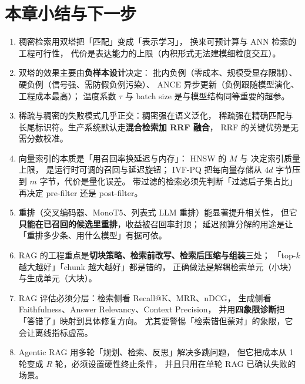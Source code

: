 \section{本章小结与下一步}

\begin{keypoint}[本章要点回顾]
\begin{enumerate}
  \item 稠密检索用双塔把「匹配」变成「表示学习」，
        换来可预计算与 ANN 检索的工程可行性，
        代价是表达能力的上限（内积形式无法建模细粒度交互）。
  \item 双塔的效果主要由\textbf{负样本设计}决定：
        批内负例（零成本、规模受显存限制）、硬负例（信号强、需防假负例污染）、
        ANCE 异步更新（负例跟随模型演化、工程成本最高）；
        温度系数 $\tau$ 与 batch size 是与模型结构同等重要的超参。
  \item 稀疏与稠密的失败模式几乎正交：稠密强在语义泛化，
        稀疏强在精确匹配与长尾标识符。生产系统默认走\textbf{混合检索加 RRF 融合}，
        RRF 的关键优势是无需分数校准。
  \item 向量索引的本质是「用召回率换延迟与内存」：
        HNSW 的 $M$ 与  决定索引质量上限，
         是运行时可调的召回与延迟旋钮；
        IVF-PQ 把每向量存储从 $4d$ 字节压到 $m$ 字节，代价是量化误差。
        带过滤的检索必须先判断「过滤后子集占比」再决定 pre-filter 还是 post-filter。
  \item 重排（交叉编码器、MonoT5、列表式 LLM 重排）能显著提升相关性，
        但它\textbf{只能在已召回的候选里重排}，收益被召回率封顶；
        延迟预算分解的用途是让「重排多少条、用什么模型」有据可依。
  \item RAG 的工程重点是\textbf{切块策略、检索前改写、检索后压缩与组装}三处；
        「top-$k$ 越大越好」「chunk 越大越好」都是错的，
        正确做法是解耦检索单元（小块）与生成单元（大块）。
  \item RAG 评估必须分层：检索侧看 Recall@K、MRR、nDCG，
        生成侧看 Faithfulness、Answer Relevancy、Context Precision，
        并用\textbf{四象限诊断}把「答错了」映射到具体修复方向。
        尤其要警惕「检索错但蒙对」的象限，它会让离线指标虚高。
  \item Agentic RAG 用多轮「规划、检索、反思」解决多跳问题，
        但它把成本从 1 轮变成 $R$ 轮，必须设置硬性终止条件，
        并且只用在单轮 RAG 已确认失败的场景。
\end{enumerate}
\end{keypoint}


